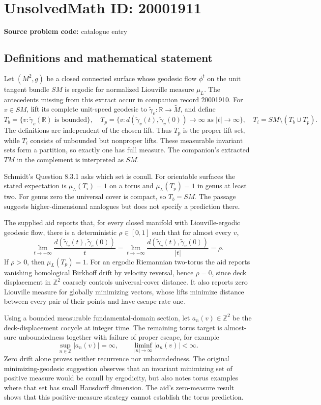 \documentclass[11pt]{article}
\newcommand{\Z}{\mathbb{Z}}
\newcommand{\R}{\mathbb{R}}
\begin{document}
\section*{UnsolvedMath ID: 20001911}
\textbf{Source problem code:} catalogue entry
\subsection{Definitions and mathematical statement}
Let \((M^2,g)\) be a closed connected surface whose geodesic flow \(\phi^t\) on the unit tangent bundle \(SM\) is ergodic for normalized Liouville measure \(\mu_L\). The antecedents missing from this extract occur in companion record 20001910. For \(v\in SM\), lift its complete unit-speed geodesic to \(\widetilde\gamma_v:\R\to\widetilde M\), and define
\[
T_b=\{v:\widetilde\gamma_v(\R)\text{ is bounded}\},\quad
T_p=\{v:d(\widetilde\gamma_v(t),\widetilde\gamma_v(0))\to\infty
\text{ as }|t|\to\infty\},\quad
T_i=SM\setminus(T_b\cup T_p).
\]
The definitions are independent of the chosen lift. Thus \(T_p\) is the proper-lift set, while \(T_i\) consists of unbounded but nonproper lifts. These measurable invariant sets form a partition, so exactly one has full measure. The companion's extracted \(TM\) in the complement is interpreted as \(SM\).

Schmidt's Question 8.3.1 asks which set is conull. For orientable surfaces the stated expectation is \(\mu_L(T_i)=1\) on a torus and \(\mu_L(T_p)=1\) in genus at least two. For genus zero the universal cover is compact, so \(T_b=SM\). The passage suggests higher-dimensional analogues but does not specify a prediction there.

The supplied aid reports that, for every closed manifold with Liouville-ergodic geodesic flow, there is a deterministic \(\rho\in[0,1]\) such that for almost every \(v\),
\[
\lim_{t\to+\infty}\frac{d(\widetilde\gamma_v(t),\widetilde\gamma_v(0))}{t}
=\lim_{t\to-\infty}\frac{d(\widetilde\gamma_v(t),\widetilde\gamma_v(0))}{|t|}
=\rho.
\]
If \(\rho>0\), then \(\mu_L(T_p)=1\). For an ergodic Riemannian two-torus the aid reports vanishing homological Birkhoff drift by velocity reversal, hence \(\rho=0\), since deck displacement in \(\Z^2\) coarsely controls universal-cover distance. It also reports zero Liouville measure for globally minimizing vectors, whose lifts minimize distance between every pair of their points and have escape rate one.

Using a bounded measurable fundamental-domain section, let \(a_n(v)\in\Z^2\) be the deck-displacement cocycle at integer time. The remaining torus target is almost-sure unboundedness together with failure of proper escape, for example
\[
\sup_{n\in\Z}|a_n(v)|=\infty,\qquad
\liminf_{|n|\to\infty}|a_n(v)|<\infty.
\]
Zero drift alone proves neither recurrence nor unboundedness. The original minimizing-geodesic suggestion observes that an invariant minimizing set of positive measure would be conull by ergodicity, but also notes torus examples where that set has small Hausdorff dimension. The aid's zero-measure result shows that this positive-measure strategy cannot establish the torus prediction.
\end{document}
